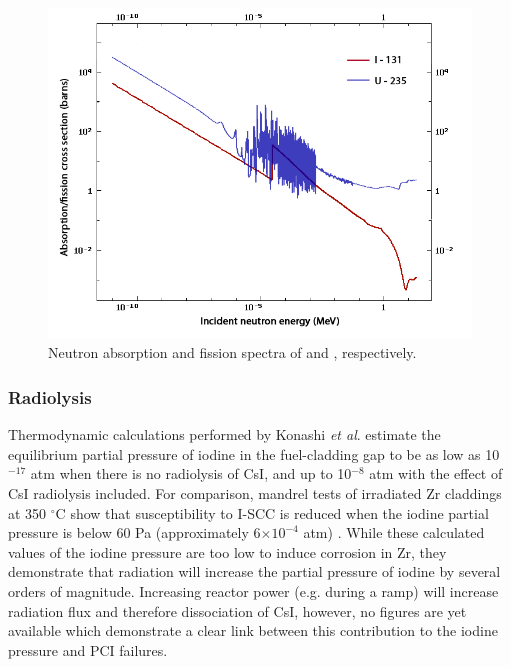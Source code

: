 \begin{figure}[ht] %
\centering
\includegraphics[width=14cm]{images/te_i_xsection.png}
\caption[Neutron absorption and fission spectra of  and , respectively.]{Neutron absorption and fission spectra of  and , respectively.}
\label{figure:te_i_xsection}
\end{figure}

\subsubsection{Radiolysis}

Thermodynamic calculations performed by Konashi \emph{et al}. \cite{Konashi1983} estimate the equilibrium partial pressure of iodine in the fuel-cladding gap to be as low as 10$^{-17}$ atm when there is no radiolysis of CsI, and up to 10$^{-8}$ atm with the effect of CsI radiolysis included. For comparison, mandrel tests of irradiated Zr claddings at 350 $^{\circ}$C show that susceptibility to I-SCC is reduced when the iodine partial pressure is below 60 Pa (approximately 6$\times 10^{-4}$ atm) \cite{anghel2010experimental}. While these calculated values of the iodine pressure are too low to induce corrosion in Zr, they demonstrate that radiation will increase the partial pressure of iodine by several orders of magnitude. Increasing reactor power (e.g. during a ramp) will increase radiation flux and therefore dissociation of CsI, however, no figures are yet available which demonstrate a clear link between this contribution to the iodine pressure and PCI failures. 

